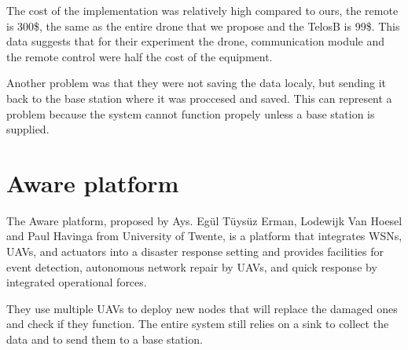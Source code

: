 The cost of the implementation was relatively high compared to ours, the remote is 300\$, the same as the entire drone that we propose and the TelosB is 99\$. This data suggests that for their experiment the drone, communication module and the remote control were half the cost of the equipment.

Another problem was that they were not saving the data localy, but sending it back to the base station where it was proccesed and saved. This can represent a problem because the system cannot function propely unless a base station is supplied.

\section{Aware platform}

The Aware platform, proposed by Ays. Egül Tüysüz Erman, Lodewijk Van Hoesel and Paul Havinga from University of Twente, is a platform that integrates WSNs, UAVs, and actuators into a disaster response setting and provides facilities for event detection, autonomous network repair by UAVs, and quick response by integrated operational forces\cite{erman2008enabling}.

They use multiple UAVs to deploy new nodes that will replace the damaged ones and check if they function. The entire system still relies on a sink to collect the data and to send them to a base station.
